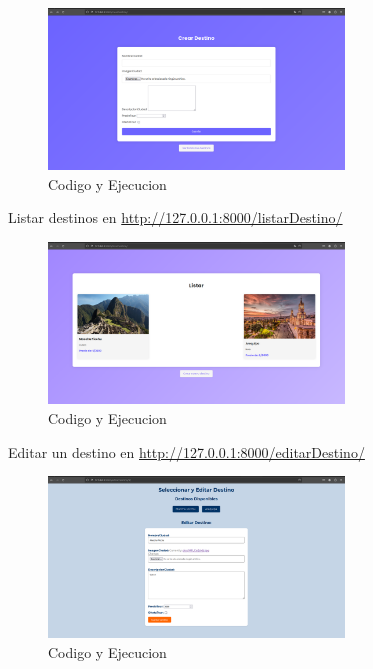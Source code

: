 \documentclass[10pt, a4paper]{article}
\begin{document}
\begin{figure}[H]
  \centering
  \includegraphics[width=0.7\textwidth]{img/crear.png}
  \caption{Codigo y Ejecucion}
\end{figure}

\singlespacing
Listar destinos en \href{http://127.0.0.1:8000/listarDestino/}{http://127.0.0.1:8000/listarDestino/}

\begin{figure}[H]
  \centering
  \includegraphics[width=0.7\textwidth]{img/listar.png}
  \caption{Codigo y Ejecucion}
\end{figure}

\singlespacing
Editar un destino en \href{http://127.0.0.1:8000/editarDestino/}{http://127.0.0.1:8000/editarDestino/}

\begin{figure}[H]
  \centering
  \includegraphics[width=0.7\textwidth]{img/editar.png}
  \caption{Codigo y Ejecucion}
\end{figure}
\end{document}
